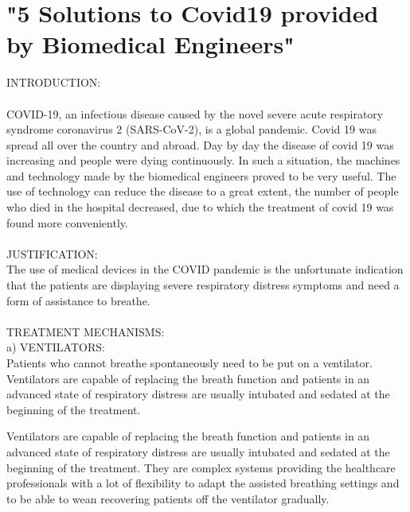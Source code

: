 \documentclass{article}
\begin{document}
\section{"5 Solutions to Covid19 provided by Biomedical Engineers"}
INTRODUCTION:\\
\\
COVID-19, an infectious disease caused by the novel severe acute respiratory syndrome coronavirus 2 (SARS-CoV-2), is a global pandemic. 
Covid 19 was spread all over the country and abroad. Day by day the disease of covid 19 was increasing and people were dying continuously. In such a situation, the machines and technology made by the biomedical engineers proved to be very useful. The use of technology can reduce the disease to a great extent, the number of people who died in the hospital decreased, due to which the treatment of covid 19 was found more conveniently.\\
\\
JUSTIFICATION:\\

The use of medical devices in the COVID pandemic is the unfortunate indication that the patients are displaying severe respiratory distress symptoms and need a form of assistance to breathe.\\
\\
TREATMENT MECHANISMS:\\
a) VENTILATORS:\\

Patients who cannot breathe spontaneously need to be put on a ventilator. Ventilators are capable of replacing the breath function and patients in an advanced state of respiratory distress are usually intubated and sedated at the beginning of the treatment.

Ventilators are capable of replacing the breath function and patients in an advanced state of respiratory distress are usually intubated and sedated at the beginning of the treatment. They are complex systems providing the healthcare professionals with a lot of flexibility to adapt the assisted breathing settings and to be able to wean recovering patients off the ventilator gradually.
\end{document}
